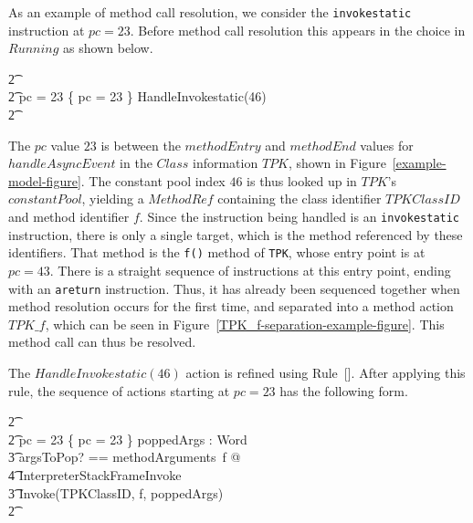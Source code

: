 As an example of method call resolution, we consider the
\texttt{invokestatic} instruction at $pc = 23$. 
Before method call resolution this appears in the choice in $Running$
as shown below.
\begin{circusaction}
  \t2 {} \cdots {} \\
  \t2 {} \circelse pc = 23 \circthen \{ pc = 23 \} \circseq HandleInvokestatic(46) \\
  \t2 {} \cdots {} \\
\end{circusaction}
The $pc$ value $23$ is between the $methodEntry$ and $methodEnd$
values for $handleAsyncEvent$ in the $Class$ information $TPK$, shown
in Figure~\ref{example-model-figure}.
The constant pool index $46$ is thus looked up in $TPK$'s
$constantPool$, yielding a $MethodRef$ containing the class identifier
$TPKClassID$ and method identifier $f$.
Since the instruction being handled is an \texttt{invokestatic}
instruction, there is only a single target, which is the method
referenced by these identifiers.
That method is the \texttt{f()} method of \texttt{TPK}, whose entry
point is at $pc = 43$.
There is a straight sequence of instructions at this entry point,
ending with an \texttt{areturn} instruction. 
Thus, it has already been sequenced together when method resolution
occurs for the first time, and separated into a method action
$TPK\_f$, which can be seen in
Figure~\ref{TPK_f-separation-example-figure}.
This method call can thus be resolved.

The $HandleInvokestatic(46)$ action is refined using
Rule~[].
After applying this rule, the sequence of actions starting at
$pc = 23$ has the following form.
\begin{circusaction}
  \t2 {} \cdots {} \\
  \t2 {} \circelse pc = 23 \circthen \{ pc = 23 \} \circseq \circvar poppedArgs : \seq Word \circspot \\
  \t3 \lschexpract \exists argsToPop? == methodArguments~f @ \\
  \t4 InterpreterStackFrameInvoke \rschexpract \circseq \\
  \t3 Invoke(TPKClassID, f, poppedArgs) \\
  \t2 {} \cdots {}
\end{circusaction}

